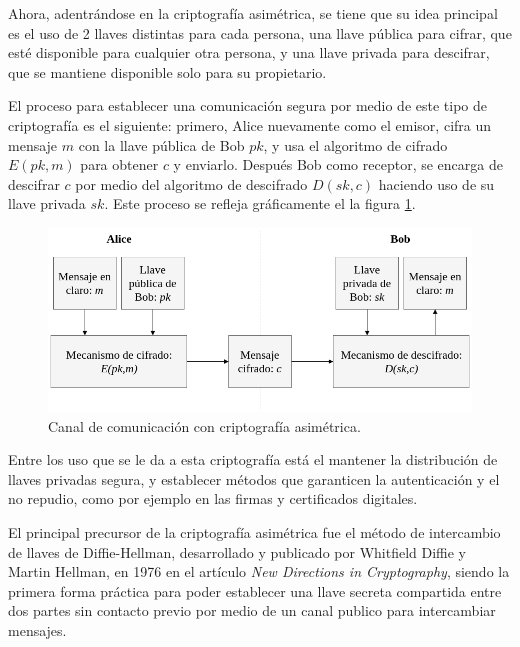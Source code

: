   Ahora, adentrándose en la criptografía asimétrica, se tiene que su idea
  principal es el uso de 2 llaves distintas para cada persona, una llave
  pública para cifrar, que esté disponible para cualquier otra persona, y una
  llave privada para descifrar, que se mantiene disponible solo para su
  propietario.

  El proceso para establecer una comunicación segura por medio de este tipo
  de criptografía es el siguiente: primero, Alice nuevamente como el emisor,
  cifra un mensaje $m$ con la llave pública de Bob $pk$, y usa el algoritmo de
  cifrado $E(pk,m)$ para obtener $c$ y enviarlo. Después Bob como receptor,
  se encarga de descifrar $c$ por medio del algoritmo de descifrado
  $D(sk,c)$ haciendo uso de su llave privada $sk$. Este proceso se refleja
  gráficamente el la figura \ref{cripto_asimetrica}.

  \begin{figure}[H]
    \begin{center}
      \includegraphics[width=0.8\linewidth]
        {contenidos/antecedentes/intro/img/cripto_asimetrica.png}
      \caption{Canal de comunicación con criptografía asimétrica.}
      \label{cripto_asimetrica}
    \end{center}
  \end{figure}

  Entre los uso que se le da a esta criptografía está el mantener la
  distribución de llaves privadas segura, y establecer métodos que garanticen
  la autenticación y el no repudio, como por ejemplo en las firmas y
  certificados digitales.

  El principal precursor de la criptografía asimétrica fue el método de 
  intercambio de llaves de Diffie-Hellman, desarrollado y publicado por 
  Whitfield Diffie y Martin Hellman, en 1976 en el artículo \textit{New 
  Directions in Cryptography}, siendo la primera forma práctica para poder 
  establecer una llave secreta compartida entre dos partes sin contacto 
  previo por medio de un canal publico para intercambiar mensajes.

